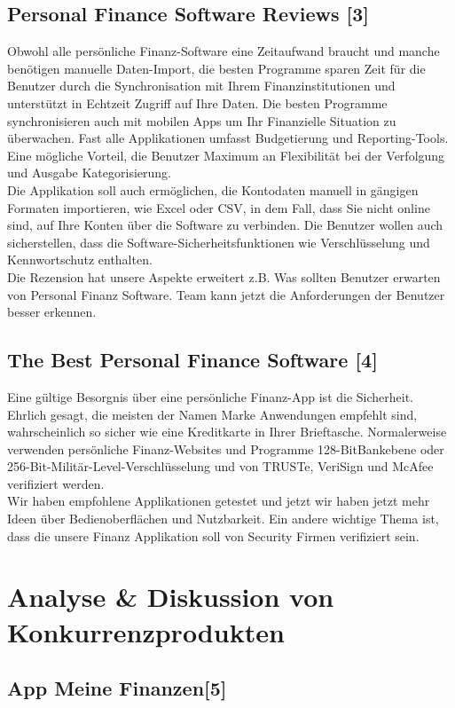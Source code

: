 \documentclass[runningheads,a4paper]{llncs}
\begin{document}
\subsection{Personal Finance Software Reviews [3]}
Obwohl alle persönliche Finanz-Software eine Zeitaufwand braucht und manche benötigen manuelle Daten-Import, die besten Programme sparen Zeit für die Benutzer durch die Synchronisation mit Ihrem Finanzinstitutionen und unterstützt in Echtzeit Zugriff auf Ihre Daten. Die besten Programme synchronisieren auch mit mobilen Apps um Ihr Finanzielle Situation zu überwachen. 
Fast alle Applikationen umfasst Budgetierung und Reporting-Tools. Eine mögliche Vorteil, die Benutzer Maximum an Flexibilität bei der Verfolgung und Ausgabe Kategorisierung. \\Die Applikation soll auch ermöglichen, die Kontodaten manuell in gängigen Formaten importieren, wie Excel oder CSV, in dem Fall, dass Sie nicht online sind, auf Ihre Konten über die Software zu verbinden. Die 
Benutzer wollen auch sicherstellen, dass die Software-Sicherheitsfunktionen wie Verschlüsselung und Kennwortschutz enthalten.\\ Die Rezension hat unsere Aspekte erweitert z.B. Was sollten Benutzer erwarten von Personal Finanz Software. Team kann jetzt die Anforderungen der Benutzer besser erkennen.  

\subsection{The Best Personal Finance Software [4]}
Eine gültige Besorgnis über eine persönliche Finanz-App ist die Sicherheit. Ehrlich gesagt, die meisten der Namen Marke Anwendungen empfehlt sind, wahrscheinlich so sicher wie eine Kreditkarte in Ihrer Brieftasche. Normalerweise verwenden persönliche Finanz-Websites und Programme 128-BitBankebene oder 256-Bit-Militär-Level-Verschlüsselung und von TRUSTe, VeriSign und McAfee verifiziert werden. \\ Wir haben empfohlene Applikationen getestet und jetzt wir haben jetzt mehr Ideen über Bedienoberflächen und Nutzbarkeit. Ein andere wichtige Thema ist, dass die unsere Finanz Applikation soll von Security Firmen verifiziert sein.
\clearpage

\section{Analyse \& Diskussion von Konkurrenzprodukten}
\subsection{App Meine Finanzen[5]}
\end{document}
